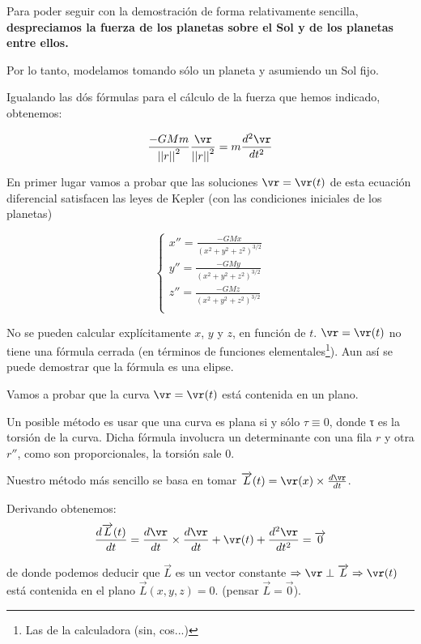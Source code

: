 Para poder seguir con la demostración de forma relativamente sencilla, \textbf{despreciamos la fuerza de los planetas sobre el Sol y de los planetas entre ellos.}

Por lo tanto, modelamos tomando sólo un planeta y asumiendo un Sol fijo.

Igualando las dós fórmulas para el cálculo de la fuerza que hemos indicado, obtenemos:

$$ \frac{-GMm}{{||r||}^2} \frac{\vr}{{||r||}^2}  =  m \frac{d^2\vr}{d t^2}$$


En primer lugar vamos a probar que las soluciones $\vr = \vr(t)$ de esta ecuación diferencial satisfacen las leyes de Kepler (con las condiciones iniciales de los planetas)

$$
\begin{cases}
 x'' = \frac{-GMx}{(x^2 + y^2 + z^2)^{3/2}}\\
 y'' = \frac{-GMy}{(x^2 + y^2 + z^2)^{3/2}}\\
 z'' = \frac{-GMz}{(x^2 + y^2 + z^2)^{3/2}}\\
\end{cases}
$$


 \begin{obs}
 No se pueden calcular explícitamente $x$, $y$ y $z$, en función de $t$. $\vr = \vr(t)$ no tiene una fórmula cerrada (en términos de funciones elementales\footnote{Las de la calculadora (sin, cos...)}). Aun así se puede demostrar que la fórmula es una elipse.
 \end{obs}


Vamos a probar que la curva $\vr = \vr(t)$ está contenida en un plano.

Un posible método es usar que una curva es plana si y sólo $τ \equiv 0$, donde τ es la torsión de la curva. Dicha fórmula involucra un determinante con una fila $r$ y otra $r''$, como son proporcionales, la torsión sale 0.


Nuestro método más sencillo se basa en tomar $\overrightarrow{L}(t) = \vr(x) \times \frac{d\vr}{dt}$.

Derivando obtenemos:
$$\frac{d\overrightarrow{L}(t)}{dt} = \frac{d\vr}{dt} \times \frac{d\vr}{dt} + \vr(t) + \frac{d^2\vr}{dt^2} = \overrightarrow{0}$$

de donde podemos deducir que $\overrightarrow{L}$ es un vector constante $\Rightarrow \vr \perp \overrightarrow{L} \Rightarrow \vr(t)$ está contenida en el plano $\overrightarrow{L}(x,y,z) = 0 $.
(pensar $\overrightarrow{L} = \overrightarrow{0}$).

